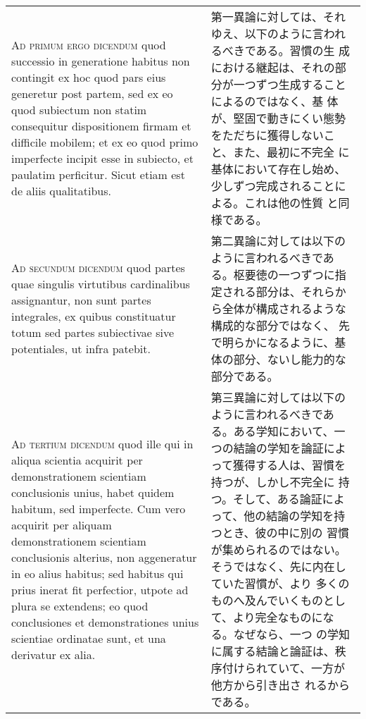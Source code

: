 \documentclass[10pt]{jsarticle} %
\begin{document}
\begin{longtable}{p{21em}p{21em}}
\\



{\scshape Ad primum ergo dicendum} quod successio in generatione
habitus non contingit ex hoc quod pars eius generetur post partem, sed
ex eo quod subiectum non statim consequitur dispositionem firmam et
difficile mobilem; et ex eo quod primo imperfecte incipit esse in
subiecto, et paulatim perficitur. Sicut etiam est de aliis
qualitatibus.

&

第一異論に対しては、それゆえ、以下のように言われるべきである。習慣の生
成における継起は、それの部分が一つずつ生成することによるのではなく、基
体が、堅固で動きにくい態勢をただちに獲得しないこと、また、最初に不完全
に基体において存在し始め、少しずつ完成されることによる。これは他の性質
と同様である。

\\



{\scshape Ad secundum dicendum} quod partes quae singulis virtutibus
cardinalibus assignantur, non sunt partes integrales, ex quibus
constituatur totum sed partes subiectivae sive potentiales, ut infra
patebit.

&

第二異論に対しては以下のように言われるべきである。枢要徳の一つずつに指
定される部分は、それらから全体が構成されるような構成的な部分ではなく、
先で明らかになるように、基体の部分、ないし能力的な部分である。

\\



{\scshape Ad tertium dicendum} quod ille qui in aliqua scientia
acquirit per demonstrationem scientiam conclusionis unius, habet
quidem habitum, sed imperfecte. Cum vero acquirit per aliquam
demonstrationem scientiam conclusionis alterius, non aggeneratur in eo
alius habitus; sed habitus qui prius inerat fit perfectior, utpote ad
plura se extendens; eo quod conclusiones et demonstrationes unius
scientiae ordinatae sunt, et una derivatur ex alia.

&

第三異論に対しては以下のように言われるべきである。ある学知において、一
つの結論の学知を論証によって獲得する人は、習慣を持つが、しかし不完全に
持つ。そして、ある論証によって、他の結論の学知を持つとき、彼の中に別の
習慣が集められるのではない。そうではなく、先に内在していた習慣が、より
多くのものへ及んでいくものとして、より完全なものになる。なぜなら、一つ
の学知に属する結論と論証は、秩序付けられていて、一方が他方から引き出さ
れるからである。

\end{longtable}
\end{document}
